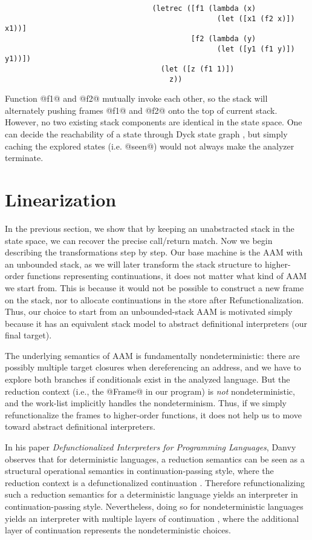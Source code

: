 \documentclass[acmsmall, review]{acmart}\settopmatter{}
\begin{document}
\begin{lstlisting}
                                  (letrec ([f1 (lambda (x)
                                                 (let ([x1 (f2 x)]) x1))]
                                           [f2 (lambda (y)
                                                 (let ([y1 (f1 y)]) y1))])
                                    (let ([z (f1 1)])
                                      z))
\end{lstlisting}

Function @f1@ and @f2@ mutually invoke each other, so the stack will alternately pushing
frames @f1@ and @f2@ onto the top of current stack. However, no two existing stack
components are identical in the state space. One can decide the reachability of a state
through Dyck state graph \cite{earl2010pushdown, earl2012introspective}, but simply
caching the explored states (i.e. @seen@) would not always make the analyzer terminate.


\section{Linearization} \label{linear}

In the previous section, we show that by keeping an unabstracted stack in the state
space, we can recover the precise call/return match. Now we begin describing the
transformations step by step. Our base machine is the AAM with an unbounded
stack, as we will later transform the stack structure to higher-order functions
representing continuations, it does not matter what kind of AAM we start from.
This is because it would not be possible to construct a new frame on the stack, nor
to allocate continuations in the store after Refunctionalization.
Thus, our choice to start from an unbounded-stack AAM is motivated simply because
it has an equivalent stack model to abstract definitional interpreters (our final target).

The underlying semantics of AAM is fundamentally nondeterministic: there are possibly
multiple target closures when dereferencing an address, and we have to explore both branches
if conditionals exist in the analyzed language. But the reduction context (i.e., the @Frame@ in
our program) is \emph{not} nondeterministic, and the work-list implicitly
handles the nondeterminism. Thus, if we simply refunctionalize the frames to higher-order
functions, it does not help us to move toward abstract definitional interpreters.

In his paper \textit{Defunctionalized Interpreters for Programming Languages},
Danvy observes that for deterministic languages, a reduction semantics can be seen as 
a structural operational semantics in continuation-passing style, where the reduction context is
a defunctionalized continuation \cite{Danvy:2008:DIP:1411204.1411206}. Therefore
refunctionalizing such a reduction semantics for a deterministic language yields 
an interpreter in continuation-passing style. 
Nevertheless, doing so for nondeterministic languages yields an interpreter
with multiple layers of continuation \cite{Danvy:2006:RW:2171265.2171268, DANVY2009534},
where the additional layer of continuation represents the nondeterministic choices.
\end{document}
